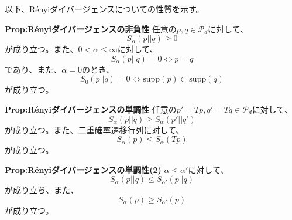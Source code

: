\documentclass[a4paper,11pt]{jsarticle}
\numberwithin{equation}{section}
\begin{document}
以下、Rényiダイバージェンスについての性質を示す。\\
\begin{itembox}[l]{\textbf{Prop:Rényiダイバージェンスの非負性}}
    任意の$p, q \in \mathcal{P}_d$に対して、
    \begin{equation}
        S_{\alpha}(p||q) \geq 0
    \end{equation}
    が成り立つ。また、$0 < \alpha \leq  \infty$に対して、
    \begin{equation}
        S_{\alpha}(p||q) =0 \Leftrightarrow p = q
    \end{equation}
    であり、また、$\alpha =0$のとき、
    \begin{equation}
        S_{0}(p||q) = 0 \Leftrightarrow \text{supp}(p) \subset \text{supp}(q)
    \end{equation}
    が成り立つ。
\end{itembox}

\begin{itembox}[l]{\textbf{Prop:Rényiダイバージェンスの単調性}}
    任意の$p' = Tp, q' = Tq \in \mathcal{P}_d$に対して、
    \begin{equation}
        S_{\alpha}(p||q) \geq S_{\alpha}(p'||q')
    \end{equation}
    が成り立つ。また、二重確率遷移行列に対して、
    \begin{equation}
        S_{\alpha}(p) \leq S_{\alpha}(Tp)
    \end{equation}
    が成り立つ。
\end{itembox}

\begin{itembox}[l]{\textbf{Prop:Rényiダイバージェンスの単調性(2)}}
    $\alpha \leq \alpha' $に対して、
    \begin{equation}
        S_{\alpha}(p||q) \leq S_{\alpha'}(p||q)
    \end{equation}
    が成り立ち、また、
    \begin{equation}
        S_{\alpha}(p) \geq S_{\alpha'}(p)
    \end{equation}
    が成り立つ。
\end{itembox}
\end{document}
